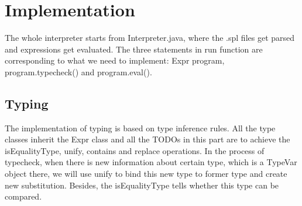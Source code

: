 \documentclass[paper=a4, fontsize=11pt]{scrartcl}
\begin{document}


 

\section{Implementation}
The whole interpreter starts from Interpreter.java, where the .spl files get parsed and expressions get evaluated. The three statements in run function are corresponding to what we need to implement: Expr program, program.typecheck() and program.eval().

\subsection{Typing}
The implementation of typing is based on type inference rules. All the type classes inherit the Expr class and all the TODOs in this part are to achieve the isEqualityType, unify, contains and replace operations. In the process of typecheck, when there is new information about certain type, which is a TypeVar object there, we will use unify to bind this new type to former type and create new substitution. Besides, the isEqualityType tells whether this type can be compared.
\end{document}
